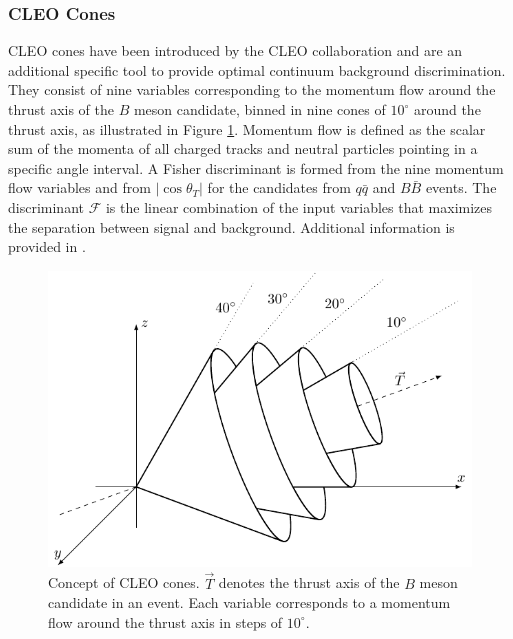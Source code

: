 \subsubsection{CLEO Cones}
CLEO cones have been introduced by the CLEO collaboration and are an additional specific tool to provide optimal continuum background discrimination. They consist of nine variables corresponding to the momentum flow around the thrust axis of the $B$ meson candidate, binned in nine cones of $10^\circ$ around the thrust axis, as illustrated in Figure \ref{fig:ccones}. Momentum flow is defined as the scalar sum of the momenta of all charged tracks and neutral particles pointing in a specific angle interval. A Fisher discriminant is formed from the nine momentum flow variables and from $\vert \cos\theta_T\vert$ for the candidates from $q \bar q$ and $B \bar B$ events. The discriminant $\mathcal{F}$ is the linear combination of the input variables that maximizes the separation between signal and background. Additional information is provided in \cite{asner1996search}.

\begin{figure}[H]
	\centering
	\captionsetup{width=0.8\linewidth}
	\includegraphics[scale=1]{texfig/CCones}
	\caption{Concept of CLEO cones. $\vec{T}$ denotes the thrust axis of the $B$ meson candidate in an event. Each variable corresponds to a momentum flow around the thrust axis in steps of $10^\circ$.}
	\label{fig:ccones}
\end{figure}

